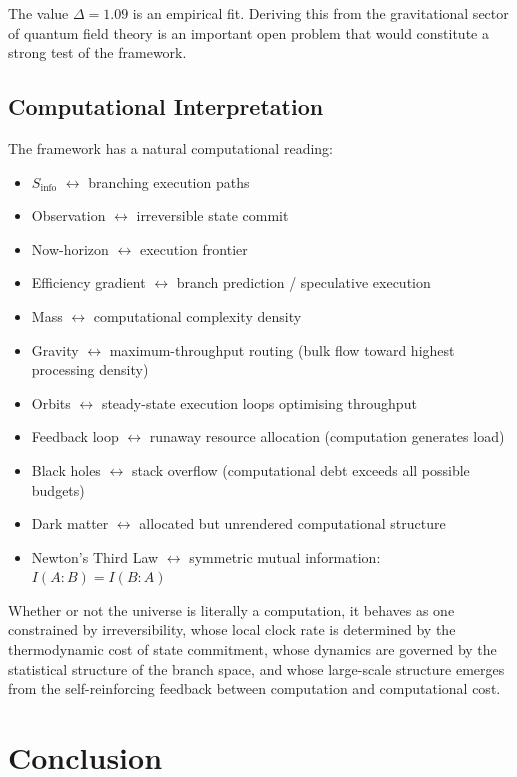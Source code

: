 \documentclass[12pt,a4paper]{article}
\begin{document}
The value $\Delta = 1.09$ is an empirical fit. Deriving this from the gravitational sector of quantum field theory is an important open problem that would constitute a strong test of the framework.

\subsection{Computational Interpretation}

The framework has a natural computational reading:
\begin{itemize}
    \item $S_{\mathrm{info}}$ $\leftrightarrow$ branching execution paths
    \item Observation $\leftrightarrow$ irreversible state commit
    \item Now-horizon $\leftrightarrow$ execution frontier
    \item Efficiency gradient $\leftrightarrow$ branch prediction / speculative execution
    \item Mass $\leftrightarrow$ computational complexity density
    \item Gravity $\leftrightarrow$ maximum-throughput routing (bulk flow toward highest processing density)
    \item Orbits $\leftrightarrow$ steady-state execution loops optimising throughput
    \item Feedback loop $\leftrightarrow$ runaway resource allocation (computation generates load)
    \item Black holes $\leftrightarrow$ stack overflow (computational debt exceeds all possible budgets)
    \item Dark matter $\leftrightarrow$ allocated but unrendered computational structure
    \item Newton's Third Law $\leftrightarrow$ symmetric mutual information: $I(A:B) = I(B:A)$
\end{itemize}

Whether or not the universe is literally a computation, it behaves as one constrained by irreversibility, whose local clock rate is determined by the thermodynamic cost of state commitment, whose dynamics are governed by the statistical structure of the branch space, and whose large-scale structure emerges from the self-reinforcing feedback between computation and computational cost.

\section{Conclusion}
\label{sec:conclusion}
\end{document}
